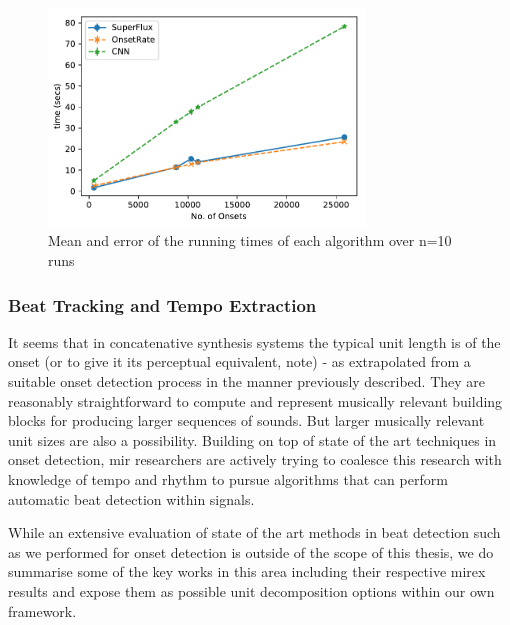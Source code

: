 {\begin{figure}
	\begin{center}
		\includegraphics[width=0.75\textwidth]{ch05_pyconcat/figures/onset_running_times.pdf}
	\end{center}
	\caption[Mean and error of the running times of each algorithm over n=10 runs]{Mean and error of the running times of each algorithm over n=10 runs}
	\label{fig:onset_running_times}
\end{figure}

\subsubsection{Beat Tracking and Tempo Extraction}

It seems that in concatenative synthesis systems the typical unit length is of the onset (or to give it its perceptual equivalent, note)  \citep{Schwarz2006, Frisson2010, Bernardes2013} - as extrapolated from a suitable onset detection process in the manner previously described. They are reasonably straightforward to compute and represent musically relevant building blocks for producing larger sequences of sounds. But larger musically relevant unit sizes are also a possibility.  Building on top of state of the art techniques in onset detection, \acrshort{mir} researchers are actively trying to coalesce this research with knowledge of tempo and rhythm to pursue algorithms that can perform automatic beat detection within signals.

While an extensive evaluation of state of the art methods in beat detection such as we performed for onset detection is outside of the scope of this thesis, we do summarise some of the key works in this area including their respective \acrshort{mirex} results and expose them as possible unit decomposition options within our own framework. 

}
